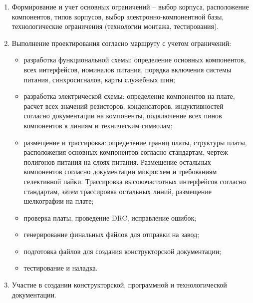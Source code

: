 \begin{enumerate}
	\item Формирование и учет основных ограничений – выбор корпуса, расположение компонентов, типов корпусов, выбор электронно-компонентной базы, технологические ограничения (технологии монтажа, тестирования).
	\item Выполнение проектирования согласно маршруту с учетом ограничений: 
 \begin{itemize}
 	\item разработка функциональной схемы: определение основных компонентов, всех интерфейсов, номиналов питания, порядка включения системы питания, синхросигналов, карты служебных шин;
 	\item разработка электрической схемы: определение компонентов на плате, расчет всех значений резисторов,	конденсаторов, индуктивностей согласно документации на компоненты, подключение всех пинов компонентов к линиям и техническим символам;
 	\item размещение и трассировка: определение границ платы, структуры платы, расположения основных компонентов согласно стандартам, чертеж полигонов питания на слоях питания. Размещение остальных компонентов согласно документации микросхем и требованиям селективной пайки. Трассировка высокочастотных интерфейсов согласно стандартам, затем трассировка остальных линий, размещение шелкографии на плате;
 	\item проверка платы, проведение DRC, исправление ошибок;
 	\item генерирование финальных файлов для отправки на завод;
 	\item подготовка файлов для создания конструкторской документации;
 	\item тестирование и наладка.
 \end{itemize}
	\item Участие в создании конструкторской, программной и технологической документации.
\end{enumerate}

\clearpage